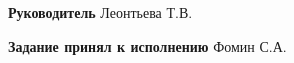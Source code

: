 \vfill

\noindent \textbf{Руководитель} \hfill
\hfill \uline{\hspace{3cm}} \hspace{1.1cm} Леонтьева Т.В.

\vspace{1cm}

\noindent \textbf{Задание принял к исполнению} \hfill
\hfill \uline{\hspace{3cm}} \hspace{1.7cm} Фомин С.А.

\newpage
